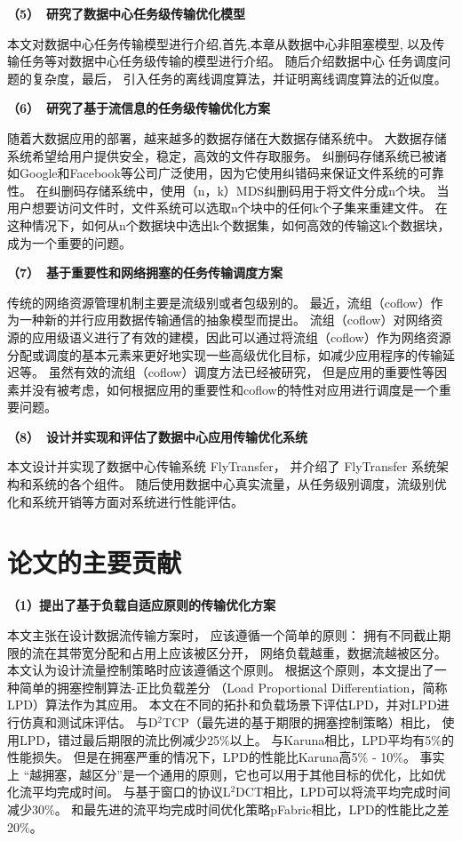 \textbf{（5）~研究了数据中心任务级传输优化模型}

本文对数据中心任务传输模型进行介绍,首先,本章从数据中心非阻塞模型, 
以及传输任务等对数据中心任务级传输的模型进行介绍。
随后介绍数据中心 任务调度问题的复杂度，最后，
引入任务的离线调度算法，并证明离线调度算法的近似度。

\textbf{（6）~研究了基于流信息的任务级传输优化方案 }

随着大数据应用的部署，越来越多的数据存储在大数据存储系统中。
大数据存储系统希望给用户提供安全，稳定，高效的文件存取服务。
纠删码存储系统已被诸如Google和Facebook等公司广泛使用，因为它使用纠错码来保证文件系统的可靠性。
在纠删码存储系统中，使用（n，k）MDS纠删码用于将文件分成n个块。
当用户想要访问文件时，文件系统可以选取n个块中的任何k个子集来重建文件。
在这种情况下，如何从n个数据块中选出k个数据集，如何高效的传输这k个数据块，成为一个重要的问题。

\textbf{（7）~基于重要性和网络拥塞的任务传输调度方案}

传统的网络资源管理机制主要是流级别或者包级别的。
最近，流组（coflow）作为一种新的并行应用数据传输通信的抽象模型而提出。
流组（coflow）对网络资源的应用级语义进行了有效的建模，因此可以通过将流组（coflow）作为网络资源分配或调度的基本元素来更好地实现一些高级优化目标，如减少应用程序的传输延迟等。
虽然有效的流组（coflow）调度方法已经被研究，
但是应用的重要性等因素并没有被考虑，如何根据应用的重要性和coflow的特性对应用进行调度是一个重要问题。

\textbf{（8）~设计并实现和评估了数据中心应用传输优化系统}

本文设计并实现了数据中心传输系统 FlyTransfer，
并介绍了 FlyTransfer 系统架构和系统的各个组件。
随后使用数据中心真实流量，从任务级别调度，流级别优化和系统开销等方面对系统进行性能评估。

\section{论文的主要贡献}
\textbf{（1）提出了基于负载自适应原则的传输优化方案}

本文主张在设计数据流传输方案时，
应该遵循一个简单的原则：
拥有不同截止期限的流在其带宽分配和占用上应该被区分开，
网络负载越重，数据流越被区分。
本文认为设计流量控制策略时应该遵循这个原则。
根据这个原则，本文提出了一种简单的拥塞控制算法-正比负载差分
（Load Proportional Differentiation，简称LPD）算法作为其应用。
本文在不同的拓扑和负载场景下评估LPD，并对LPD进行仿真和测试床评估。
与D$^2$TCP（最先进的基于期限的拥塞控制策略）相比，
使用LPD，错过最后期限的流比例减少25$\%$以上。
与Karuna相比，LPD平均有5$\%$的性能损失。
但是在拥塞严重的情况下，LPD的性能比Karuna高5$\%$ - 10$\%$。
事实上 “越拥塞，越区分”是一个通用的原则，它也可以用于其他目标的优化，比如优化流平均完成时间。
与基于窗口的协议L$^2$DCT相比，LPD可以将流平均完成时间减少30$\%$。
和最先进的流平均完成时间优化策略pFabric相比，LPD的性能比之差20$\%$。 

